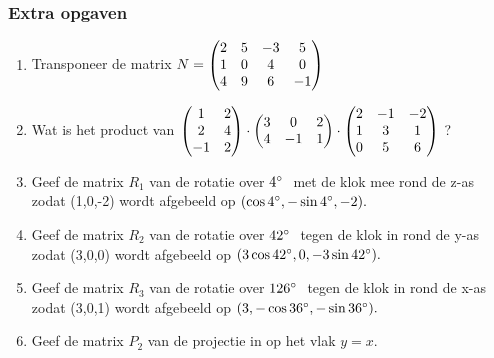 \subsubsection{Extra opgaven}
\begin{enumerate}
	\item  Transponeer de matrix 
	$ N = \begin{pmatrix}  2 & 5 & -3 &  5 \\  1 &  0 & 4 & 0 \\ 4 & 9 & 6 & -1  \end{pmatrix}$
	
	\item Wat is het product van 
	$ \begin{pmatrix}  1 & 2  \\  2 &  4 \\  -1 & 2  \end{pmatrix} \cdot 
	\begin{pmatrix}  3 & 0 & 2  \\  4 &  -1 & 1  \end{pmatrix}  \cdot  
	\begin{pmatrix}   2 & -1 & -2  \\  1 &  3 & 1  \\ 0 & 5 & 6   \end{pmatrix} $	?
	
	\item Geef de matrix  \textit{$ R_1  $} van de rotatie over $ 4\degree \  $  met de klok mee rond de  z-as zodat (1,0,-2) wordt afgebeeld op $ (\cos 4\degree , -\sin 4\degree , -2) . $ \\
	
	\item Geef de matrix  \textit{$ R_2 $} van de rotatie over $ 42\degree \  $ tegen de klok in rond de  y-as zodat (3,0,0) wordt afgebeeld op $ (3\cos 42\degree , 0,  -3\sin 42\degree ). $ \\ 
	
	\item Geef de matrix  \textit{$ R_3 $} van de rotatie over $ 126\degree \  $ tegen de klok in rond de  x-as zodat (3,0,1) wordt afgebeeld op $ (3, -\cos 36\degree ,  -\sin 36\degree ). $ \\
	
	\item Geef de matrix  \textit{$ P_2 $} van de projectie  in \RD op het vlak $  y=x $.
\end{enumerate}


